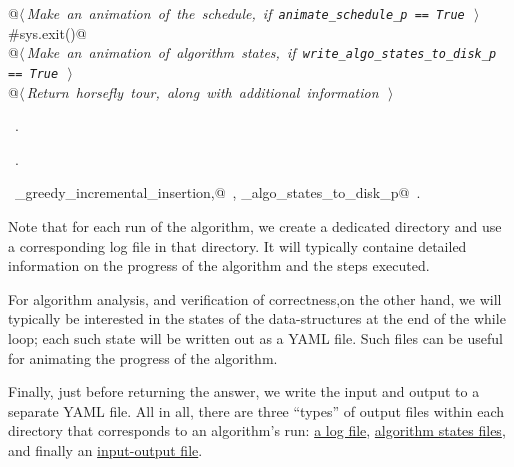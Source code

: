 \documentclass[11.5pt]{report}
\begin{document}
\begin{flushleft}
\begin{list}{}{}
\mbox{}\verb@      @\hbox{$\langle\,${\itshape Make an animation of the schedule, if \verb|animate_schedule_p == True|}\nobreak\ {\footnotesize {}}$\,\rangle$}\verb@@\\
\mbox{}\verb@      #sys.exit()@\\
\mbox{}\verb@      @\hbox{$\langle\,${\itshape Make an animation of algorithm states, if \verb|write_algo_states_to_disk_p == True|}\nobreak\ {\footnotesize {}}$\,\rangle$}\verb@@\\
\mbox{}\verb@      @\hbox{$\langle\,${\itshape Return horsefly tour, along with additional information}\nobreak\ {\footnotesize {}}$\,\rangle$}\verb@@\\
\mbox{}\verb@@{\NWsep}
\end{list}
\vspace{-1.5ex}
\footnotesize
\begin{list}{}{\setlength{\itemsep}{-\parsep}\setlength{\itemindent}{-\leftmargin}}
\item \NWtxtMacroDefBy\ .
\item \NWtxtMacroRefIn\ .
\item \NWtxtIdentsDefed\nobreak\  \verb@algo_greedy_incremental_insertion,@\nobreak\ , \verb@write_algo_states_to_disk_p@\nobreak\ .
\item{}
\end{list}
\vspace{4ex}
\end{flushleft}


\vspace{-0.8cm}\newchunk Note that for each run of the algorithm, we create a dedicated directory and 
use a corresponding log file  in that directory. It will typically containe detailed 
information on the progress of the algorithm and the steps executed. 

For algorithm analysis, and verification of correctness,on the other hand, we will 
typically  be interested in the states of the data-structures at the end of 
the while loop; each such state will be written out as a YAML file. Such files can 
be useful for animating the progress of the algorithm. 

Finally, just before returning the answer, we write the input and output 
to a separate YAML file. All in all, there are three ``types'' of output files
within each directory that corresponds to an algorithm's run: 
\underline{a log file}, \underline{algorithm states files}, and finally 
an \underline{input-output file}. 
\end{document}
